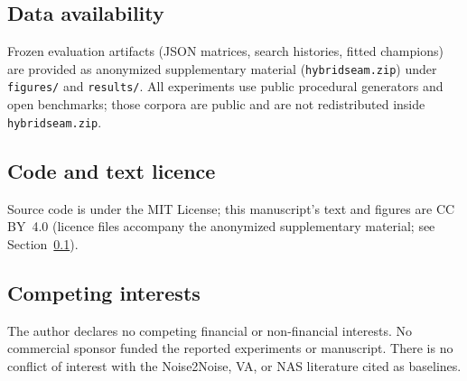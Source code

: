 \subsection{Data availability}
\label{sec:data-availability}
Frozen evaluation artifacts (JSON matrices, search histories, fitted champions)
are provided as anonymized supplementary material (\texttt{hybridseam.zip})
under \texttt{figures/} and \texttt{results/}.
All experiments use public procedural generators and open benchmarks; those corpora are public and are not redistributed inside \texttt{hybridseam.zip}.

\subsection{Code and text licence}
\label{sec:code-licence}
Source code is under the MIT License; this manuscript's text and figures are CC BY~4.0 (licence files accompany the anonymized supplementary material; see Section~\ref{sec:data-availability}).

\subsection{Competing interests}
\label{sec:competing}
The author declares no competing financial or non-financial interests.
No commercial sponsor funded the reported experiments or manuscript.
There is no conflict of interest with the Noise2Noise, VA, or NAS literature cited as baselines.
